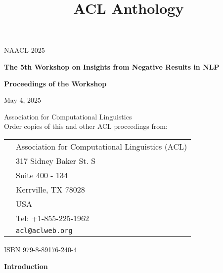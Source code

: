 \documentclass[11pt,oneside]{book}
\date{}
\title{ACL Anthology}
\begin{document}
\begin{titlepage}
  \begin{center}
    \vspace{1.5cm}

    {\LARGE NAACL 2025}

    \vspace*{65mm}

    {\bf\LARGE The 5th Workshop on Insights from Negative Results in NLP}

    \vspace*{5cm}

    {\bf\LARGE Proceedings of the Workshop}

    \vfill

    {\LARGE May 4, 2025}
  \end{center}
\end{titlepage}
\newpage



{}
\vspace*{11cm}
{\large

\noindent
{} Association for Computational Linguistics\\

\vspace*{2cm}
\noindent
Order copies of this and other ACL proceedings from:

\vspace*{1cm}
\begin{tabular}{p{1.5cm}l}
& Association for Computational Linguistics (ACL)\\
& 317 Sidney Baker St. S \\
& Suite 400 - 134\\
& Kerrville, TX 78028\\
& USA\\
& Tel: +1-855-225-1962\\
&{\tt acl@aclweb.org}\\
\end{tabular}

\vspace*{1cm}
ISBN 979-8-89176-240-4
}
\newpage


  \begin{center}
   { \Large \textbf{Introduction}}
  \end{center}
  \vspace*{0.5cm}
  
\end{document}
